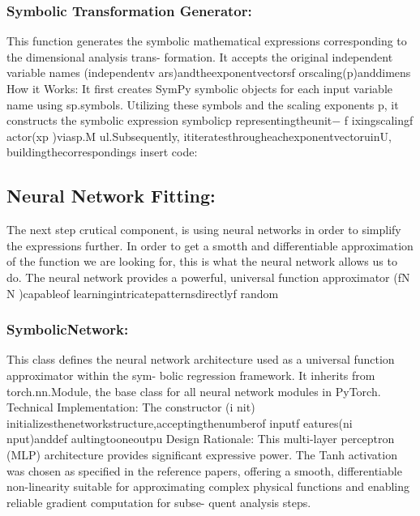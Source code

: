 \documentclass{article}
\begin{document}
\subsubsection{Symbolic Transformation Generator: }

This function generates the symbolic mathematical expressions corresponding to the dimensional analysis trans-
formation. It accepts the original independent variable names (independentv ars)andtheexponentvectorsf orscaling(p)anddimens
How it Works: It first creates SymPy symbolic objects for each input variable name using sp.symbols. Utilizing
these symbols and the scaling exponents p, it constructs the symbolic expression symbolicp representingtheunit−
f ixingscalingf actor(xp )viasp.M ul.Subsequently, ititeratesthrougheachexponentvectoruinU, buildingthecorrespondings
insert code:\\


\subsection{Neural Network Fitting: }

The next step crutical component, is using neural networks in order to simplify the expressions further.
In order to get a smotth and differentiable approximation of the function we are looking for, this is what the
neural network allows us to do.
The neural network provides a powerful, universal function approximator (fN N )capableof learningintricatepatternsdirectlyf random\\


\subsubsection{SymbolicNetwork:}

This class defines the neural network architecture used as a universal function approximator within the sym-
bolic regression framework. It inherits from torch.nn.Module, the base class for all neural network modules in
PyTorch.
Technical Implementation: The constructor (i nit) initializesthenetworkstructure,acceptingthenumberof inputf eatures(ni nput)anddef aultingtooneoutpu
Design Rationale: This multi-layer perceptron (MLP) architecture provides significant expressive power. The
Tanh activation was chosen as specified in the reference papers, offering a smooth, differentiable non-linearity
suitable for approximating complex physical functions and enabling reliable gradient computation for subse-
quent analysis steps.\\ 
\end{document}
